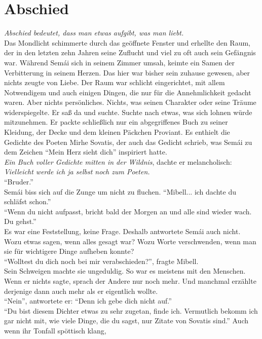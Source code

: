 \chapter{Abschied}


\textit{Abschied bedeutet, dass man etwas aufgibt, was man liebt.}\\
Das Mondlicht schimmerte durch das geöffnete Fenster und erhellte den Raum, der in den letzten zehn 
Jahren seine Zuflucht und viel zu oft auch sein Gefängnis war. Während Semái sich in seinem Zimmer 
umsah, keimte ein Samen der Verbitterung in seinem Herzen. Das hier war bisher sein zuhause 
gewesen, aber nichts zeugte von Liebe. Der Raum war schlicht eingerichtet, mit allem Notwendigem 
und auch einigen Dingen, die nur für die Annehmlichkeit gedacht waren. Aber nichts persönliches. 
Nichts, was seinen Charakter oder seine Träume widerspiegelte. Er saß da und suchte. Suchte nach 
etwas, was sich lohnen würde mitzunehmen. Er packte schließlich nur ein abgegriffenes Buch zu 
seiner Kleidung, der Decke und dem kleinen Päckchen Proviant. Es enthielt die Gedichte des Poeten 
Mirhe Sovatis, der auch das Gedicht schrieb, was Semái zu dem Zeichen ``Mein Herz sieht dich'' 
inspiriert hatte. \\
\textit{Ein Buch voller Gedichte mitten in der Wildnis}, dachte er melancholisch: 
\textit{Vielleicht werde ich ja selbst noch zum Poeten.}\\
``Bruder.''\\
Semái biss sich auf die Zunge um nicht zu fluchen. ``Mibell... ich dachte du schläfst schon.''\\
``Wenn du nicht aufpasst, bricht bald der Morgen an und alle sind wieder wach. Du gehst.''\\
Es war eine Feststellung, keine Frage. Deshalb antwortete Semái auch nicht. Wozu etwas sagen, wenn 
alles gesagt war? Wozu Worte verschwenden, wenn man sie für wichtigere Dinge aufheben konnte?\\
``Wolltest du dich noch bei mir verabschieden?'', fragte Mibell. \\
Sein Schweigen machte sie ungeduldig. So war es meistens mit den Menschen. Wenn er nichts sagte, 
sprach der Andere nur noch mehr. Und manchmal erzählte derjenige dann auch mehr als er eigentlich 
wollte. \\
``Nein'', antwortete er: ``Denn ich gebe dich nicht auf.''\\
``Du bist diesem Dichter etwas zu sehr zugetan, finde ich. Vermutlich bekomm ich gar nicht mit, wie 
viele Dinge, die du sagst, nur Zitate von Sovatis sind.'' Auch wenn ihr Tonfall spöttisch klang, 

